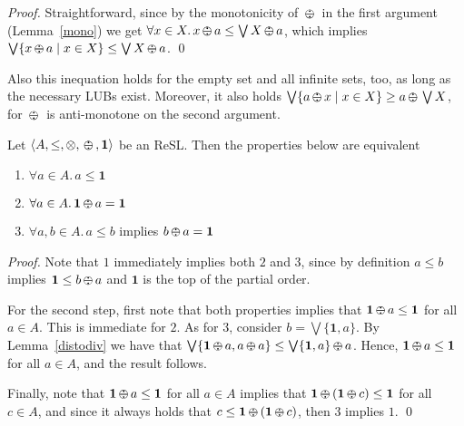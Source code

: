 \documentclass{llncs}
\def\monid{{\mathbf 0}}
\def\1{{\mathbf 1}}
\def\monop{\otimes}
\def\odiv{\, {\ominus\hspace{-7.7pt} \div} \,}
\def\monid{\mathbf{1}}
\begin{document}
\begin{proof}
Straightforward, since by the monotonicity of $\odiv$ in the first argument (Lemma~\ref{mono}) we get
 $\forall x \in X.\,x \odiv a \leq \bigvee X \odiv a$, which implies
 $\bigvee \{ x \odiv a \mid x \in X\} \leq \bigvee X \odiv a$.
\qed
\end{proof}

Also this inequation holds for the empty set and all infinite sets, too, as long as the necessary LUBs exist.
%
Moreover, it also holds $\bigvee \{ a \odiv x \mid x \in X \} \geq a \odiv \bigvee X$, for $\odiv$ is anti-monotone on the second argument.

\begin{proposition}\label{reabs}
	Let $\langle A, \leq, \monop, \odiv, \monid \rangle$ be an ReSL. Then the properties below are equivalent
	\begin{enumerate}
		\item $\forall a \in A.\, a \leq \1$
		\item $\forall a \in A.\, \1 \odiv a = \1$		
		\item $\forall a, b \in A.\, a \leq b$ implies $b \odiv a = \1$
	\end{enumerate}	
\end{proposition}

\begin{proof}
Note that $1$ immediately implies both $2$ and $3$, since by definition $a \leq b$ implies $\1 \leq b \odiv a$
and $\1$ is the top of the partial order.

For the second step, first note that both properties implies that $\1 \odiv a \leq \1$ for all $a \in A$. This is immediate
for $2$. As for $3$, %
consider $b = \bigvee \{\1, a \}$. By Lemma~\ref{distodiv} we have that
$\bigvee \{\1 \odiv a, a \odiv a\} \leq \bigvee \{\1, a \} \odiv a$. 
Hence, $\1 \odiv a \leq \1$ for all $a \in A$, and the result follows.

Finally, note that $\1 \odiv a \leq \1$ for all $a \in A$ implies that $\1 \odiv (\1 \odiv c) \leq \1$ for all $c \in A$, 
and since it always holds
that $c \leq \1 \odiv (\1 \odiv c)$, then $3$ implies $1$.
\qed
\end{proof}
\end{document}
